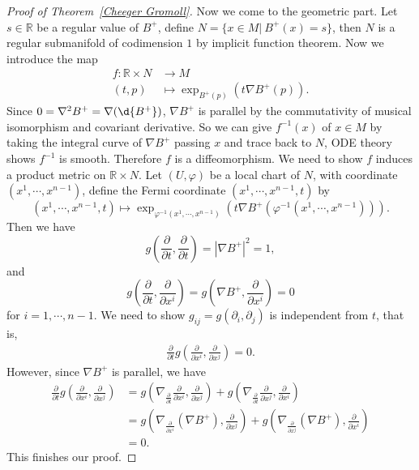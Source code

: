 \begin{proof}[Proof of Theorem~\ref{Cheeger Gromoll}]
    Now we come to the geometric part.
    Let $s\in\mathbb{R}$ be a regular value of $B^+$, define $N=\{x\in M|\ B^+(x)=s\}$, then $N$ is a regular submanifold of codimension $1$ by implicit function theorem.
    Now we introduce the map
    \begin{align*}
        f:\mathbb{R}\times N&\to M\\
        (t,p)&\mapsto\exp_{B^+(p)}(t\nabla B^+(p)).
    \end{align*}
    Since $0=\nabla^2B^+=\nabla(\d{B^+})$, $\nabla B^+$ is parallel by the commutativity of musical isomorphism and covariant derivative.
    So we can give $f^{-1}(x)$ of $x\in M$ by taking the integral curve of $\nabla B^+$ passing $x$ and trace back to $N$, ODE theory shows $f^{-1}$ is smooth.
    Therefore $f$ is a diffeomorphism.
    We need to show $f$ induces a product metric on $\mathbb{R}\times N$.
    Let $(U,\varphi)$ be a local chart of $N$, with coordinate $(x^1,\cdots,x^{n-1})$, define the Fermi coordinate $(x^1,\cdots,x^{n-1},t)$ by
    \[(x^1,\cdots,x^{n-1},t)\mapsto\exp_{\varphi^{-1}(x^1,\cdots,x^{n-1})}(t\nabla B^+(\varphi^{-1}(x^1,\cdots,x^{n-1}))).\]
    Then we have
    \[g\left(\frac{\partial{}}{\partial{t}},\frac{\partial{}}{\partial{t}}\right)=|\nabla B^+|^2=1,\]
    and
    \[g\left(\frac{\partial{}}{\partial{t}},\frac{\partial{}}{\partial{x^i}}\right)=g\left(\nabla B^+,\frac{\partial{}}{\partial{x^i}}\right)=0\]
    for $i=1,\cdots,n-1$.
    We need to show $g_{ij}=g(\partial_i,\partial_j)$ is independent from $t$, that is,
    \begin{align*}
        \frac{\partial{}}{\partial{t}}g\left(\frac{\partial{}}{\partial{x^i}},\frac{\partial{}}{\partial{x^j}}\right)=0.
    \end{align*}
    However, since $\nabla B^+$ is parallel, we have
    \begin{align*}
        \frac{\partial{}}{\partial{t}}g\left(\frac{\partial{}}{\partial{x^i}},\frac{\partial{}}{\partial{x^j}}\right)&=g\left(\nabla_{\frac{\partial{}}{\partial{t}}}\frac{\partial{}}{\partial{x^i}},\frac{\partial{}}{\partial{x^j}}\right)+g\left(\nabla_{\frac{\partial{}}{\partial{t}}}\frac{\partial{}}{\partial{x^j}},\frac{\partial{}}{\partial{x^i}}\right)\\
        &=g\left(\nabla_{\frac{\partial{}}{\partial{x^i}}}(\nabla B^+),\frac{\partial{}}{\partial{x^j}}\right)+g\left(\nabla_{\frac{\partial{}}{\partial{x^j}}}(\nabla B^+),\frac{\partial{}}{\partial{x^i}}\right)\\
        &=0.
    \end{align*}
    This finishes our proof.
\end{proof}